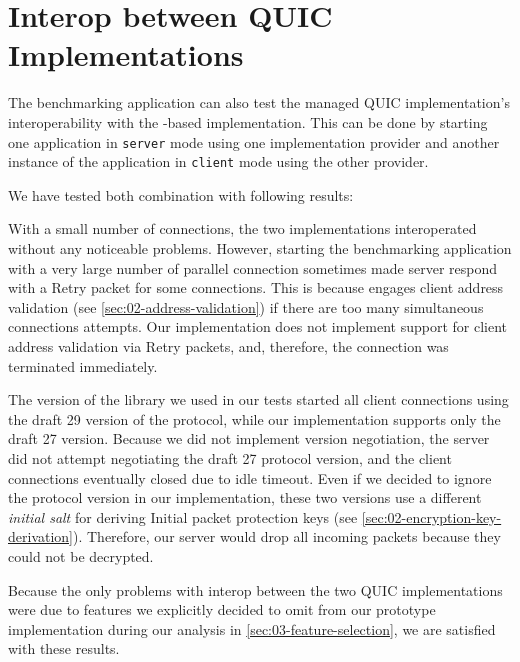 \section{Interop between QUIC Implementations}

The benchmarking application can also test the managed QUIC implementation's interoperability with
the \libmsquic{}-based implementation. This can be done by starting one application in
\texttt{server} mode using one implementation provider and another instance of the application in
\texttt{client} mode using the other provider.

We have tested both combination with following results:

\begin{itemize}

   With a small number of connections, the two
implementations interoperated without any noticeable problems. However, starting the benchmarking
application with a very large number of parallel connection sometimes made \libmsquic{} server
respond with a Retry packet for some connections. This is because \libmsquic{} engages client
address validation (see \autoref{sec:02-address-validation}) if there are too many simultaneous
connections attempts. Our implementation does not implement support for client address validation
via Retry packets, and, therefore, the connection was terminated immediately.

   The version of the \libmsquic{} library we used in
our tests started all client connections using the draft 29 version of the protocol, while our
implementation supports only the draft 27 version. Because we did not implement version negotiation,
the server did not attempt negotiating the draft 27 protocol version, and the \libmsquic{} client
connections eventually closed due to idle timeout. Even if we decided to ignore the protocol version
in our implementation, these two versions use a different \textit{initial salt} for deriving Initial
packet protection keys (see \autoref{sec:02-encryption-key-derivation}). Therefore, our server would
drop all incoming packets because they could not be decrypted.

\end{itemize}

Because the only problems with interop between the two QUIC implementations were due to features we
explicitly decided to omit from our prototype implementation during our analysis in
\autoref{sec:03-feature-selection}, we are satisfied with these results.

